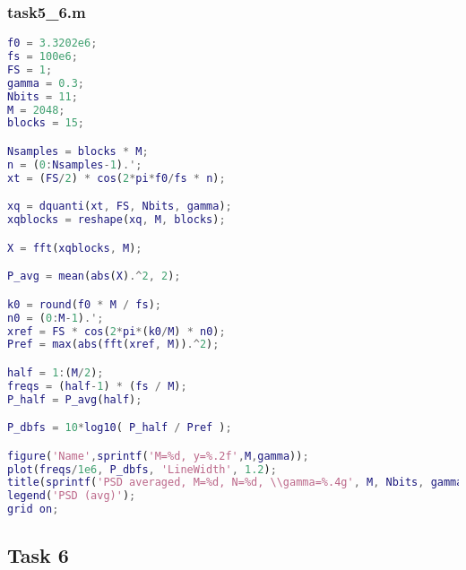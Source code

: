 \subsubsection{task5\_6.m}
\begin{lstlisting}[language=Matlab]
f0 = 3.3202e6;
fs = 100e6;
FS = 1;
gamma = 0.3;
Nbits = 11;
M = 2048;
blocks = 15;

Nsamples = blocks * M;
n = (0:Nsamples-1).';
xt = (FS/2) * cos(2*pi*f0/fs * n);

xq = dquanti(xt, FS, Nbits, gamma);
xqblocks = reshape(xq, M, blocks);

X = fft(xqblocks, M);

P_avg = mean(abs(X).^2, 2);

k0 = round(f0 * M / fs);
n0 = (0:M-1).';
xref = FS * cos(2*pi*(k0/M) * n0);
Pref = max(abs(fft(xref, M)).^2);

half = 1:(M/2);
freqs = (half-1) * (fs / M);
P_half = P_avg(half);

P_dbfs = 10*log10( P_half / Pref );

figure('Name',sprintf('M=%d, y=%.2f',M,gamma));
plot(freqs/1e6, P_dbfs, 'LineWidth', 1.2);
title(sprintf('PSD averaged, M=%d, N=%d, \\gamma=%.4g', M, Nbits, gamma));
legend('PSD (avg)');
grid on;

\end{lstlisting}

\subsection{Task 6}
